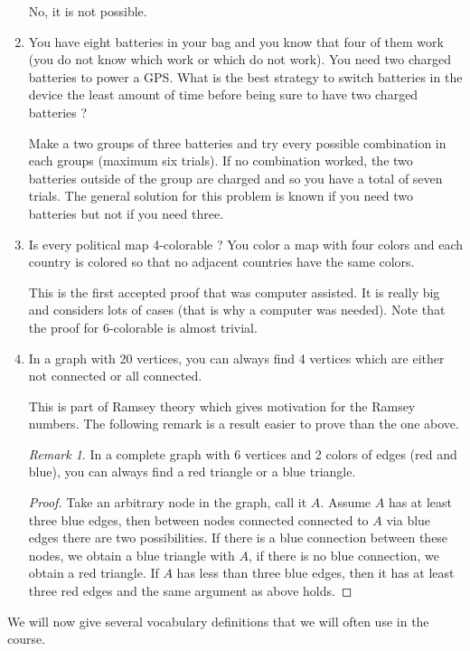 \documentclass{tufte-handout}
\theoremstyle{definition}
\theoremstyle{remark}
\newtheorem{rem}[thm]{Remark}
\begin{document}
\begin{enumerate}
	No, it is not possible.
	
	\item You have eight batteries in your bag and you know that four of them work (you do not know which work or which do not work). You need two charged batteries to power a GPS. What is the best strategy to switch batteries in the device the least amount of time before being sure to have two charged batteries ?
	
	Make a two groups of three batteries and try every possible combination in each groups (maximum six trials). If no combination worked, the two batteries outside of the group are charged and so you have a total of seven trials. The general solution for this problem is known if you need two batteries but not if you need three.
	
	\item Is every political map 4-colorable ? You color a map with four colors and each country is colored so that no adjacent countries have the same colors.
	
	This is the first accepted proof that was computer assisted. It is really big and considers lots of cases (that is why a computer was needed). Note that the proof for 6-colorable is almost trivial.
	
	\item In a graph with 20 vertices, you can always find 4 vertices which are either not connected or all connected.
	
	This is part of Ramsey theory which gives motivation for the Ramsey numbers. The following remark is a result easier to prove than the one above.
	
	\begin{rem}
		In a complete graph with 6 vertices and 2 colors of edges (red and blue), you can always find a red triangle or a blue triangle.
	\end{rem}
	\begin{proof}
		Take an arbitrary node in the graph, call it $A$. Assume $A$ has at least three blue edges, then between nodes connected connected to $A$ via blue edges there are two possibilities. If there is a blue connection between these nodes, we obtain a blue triangle with $A$, if there is no blue connection, we obtain a red triangle. If $A$ has less than three blue edges, then it has at least three red edges and the same argument as above holds.
	\end{proof}
\end{enumerate}

We will now give several vocabulary definitions that we will often use in the course.
\end{document}
